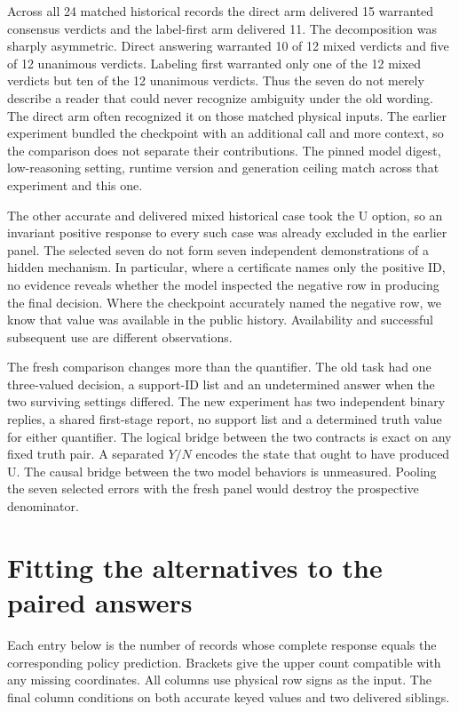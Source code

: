 \documentclass[12pt,letterpaper]{article}
\begin{document}
Across all 24 matched historical records the direct arm delivered 15 warranted consensus verdicts and the label-first arm delivered 11. The decomposition was sharply asymmetric. Direct answering warranted 10 of 12 mixed verdicts and five of 12 unanimous verdicts. Labeling first warranted only one of the 12 mixed verdicts but ten of the 12 unanimous verdicts. Thus the seven do not merely describe a reader that could never recognize ambiguity under the old wording. The direct arm often recognized it on those matched physical inputs. The earlier experiment bundled the checkpoint with an additional call and more context, so the comparison does not separate their contributions. The pinned model digest, low-reasoning setting, runtime version and generation ceiling match across that experiment and this one.

The other accurate and delivered mixed historical case took the U option, so an invariant positive response to every such case was already excluded in the earlier panel. The selected seven do not form seven independent demonstrations of a hidden mechanism. In particular, where a certificate names only the positive ID, no evidence reveals whether the model inspected the negative row in producing the final decision. Where the checkpoint accurately named the negative row, we know that value was available in the public history. Availability and successful subsequent use are different observations.

The fresh comparison changes more than the quantifier. The old task had one three-valued decision, a support-ID list and an undetermined answer when the two surviving settings differed. The new experiment has two independent binary replies, a shared first-stage report, no support list and a determined truth value for either quantifier. The logical bridge between the two contracts is exact on any fixed truth pair. A separated $Y/N$ encodes the state that ought to have produced U. The causal bridge between the two model behaviors is unmeasured. Pooling the seven selected errors with the fresh panel would destroy the prospective denominator.



\section{Fitting the alternatives to the paired answers}

Each entry below is the number of records whose complete response equals the corresponding policy prediction. Brackets give the upper count compatible with any missing coordinates. All columns use physical row signs as the input. The final column conditions on both accurate keyed values and two delivered siblings.
\end{document}
